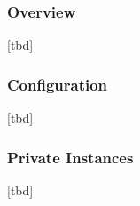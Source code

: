 

\subsubsection{Overview}

[tbd]




\subsubsection{Configuration}

[tbd]





\subsubsection{Private Instances}

[tbd]




















